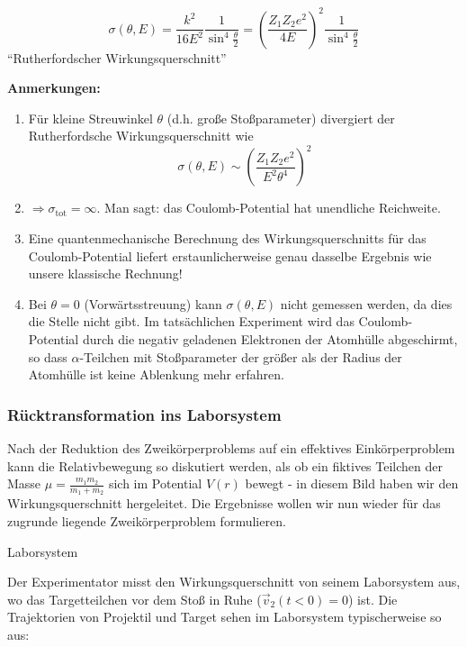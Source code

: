 \documentclass[10pt, letterpaper]{article}
\begin{document}
\[\sigma(\theta,E) = \frac{k^2}{16E^2}\frac{1}{\sin^4\frac{\theta}{2}} = \left(\frac{Z_1Z_2e^2}{4E}\right)^2\frac{1}{\sin^4\frac{\theta}{2}}\]
``Rutherfordscher Wirkungsquerschnitt''

\noindent\textbf{Anmerkungen:}

\begin{enumerate}
\item Für kleine Streuwinkel $\theta$ (d.h. große Stoßparameter) divergiert der Rutherfordsche Wirkungsquerschnitt wie
\[\sigma(\theta,E) \sim \left(\frac{Z_1Z_2e^2}{E^2\theta^4}\right)^2\]

\item $\Rightarrow \sigma_{\text{tot}} = \infty$. Man sagt: das Coulomb-Potential hat unendliche Reichweite.

\item Eine quantenmechanische Berechnung des Wirkungsquerschnitts für das Coulomb-Potential liefert erstaunlicherweise genau dasselbe Ergebnis wie unsere klassische Rechnung!

\item Bei $\theta = 0$ (Vorwärtsstreuung) kann $\sigma(\theta,E)$ nicht gemessen werden, da dies die Stelle nicht gibt. Im tatsächlichen Experiment wird das Coulomb-Potential durch die negativ geladenen Elektronen der Atomhülle abgeschirmt, so dass $\alpha$-Teilchen mit Stoßparameter der größer als der Radius der Atomhülle ist keine Ablenkung mehr erfahren.

\end{enumerate}


\subsubsection{Rücktransformation ins Laborsystem}

Nach der Reduktion des Zweikörperproblems auf ein effektives Einkörperproblem kann die Relativbewegung so diskutiert werden, als ob ein fiktives Teilchen der Masse $\mu=\frac{m_1m_2}{m_1+m_2}$ sich im Potential $V(r)$ bewegt - in diesem Bild haben wir den Wirkungsquerschnitt hergeleitet. Die Ergebnisse wollen wir nun wieder für das zugrunde liegende Zweikörperproblem formulieren.

Laborsystem

Der Experimentator misst den Wirkungsquerschnitt von seinem Laborsystem aus, wo das Targetteilchen vor dem Stoß in Ruhe ($\vec{v}_2(t<0)=0$) ist. Die Trajektorien von Projektil und Target sehen im Laborsystem typischerweise so aus:
\end{document}

